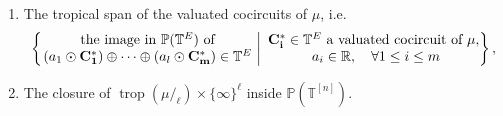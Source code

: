 \documentclass[11pt]{amsart}
\newcommand{\RR}{\mathbb R}
\newcommand{\PP}{\mathbb P}
\newcommand{\TT}{\mathbb T}
\newcommand{\trop}{\operatorname{trop}}
\newcommand{\bb}{\mathcal B}
\newcommand{\cc}{\mathcal C}
\theoremstyle{definition}
\newcommand{\madeline}[1]{{\color{magenta} \sf  Madeline: [#1]}}
\newcommand{\leon}[1]{{\color{teal} \sf Leon: [#1]}}
\begin{document}
\begin{thm:main2}
\begin{enumerate}[label=(\roman*)]
\item \label{thm2r:pt4} The tropical span of the valuated cocircuits of $\mu$, i.e.\
\[
\left\{\left. \begin{matrix} \textnormal{the image in $\PP(\TT^E)$ of} \\
(a_1\odot \mathbf{C_1^*}) \oplus \cdots \oplus (a_l \odot \mathbf{C_m^*}) \in \TT^E
\end{matrix}
\ \right|\  \begin{matrix}
\mathbf{C_i^*}\in \TT^E \textnormal{ a valuated cocircuit of } \mu,\\
\ a_i \in \RR, \quad \forall 1\leq i \leq m
\end{matrix}
\right\},
\]

\item \label{thm2r:pt5}The closure of $\trop(\mu/_\ell) \times \{\infty\}^\ell$ inside $\PP(\TT^{[n]})$.
\end{enumerate}

\end{thm:main2}
\end{document}
